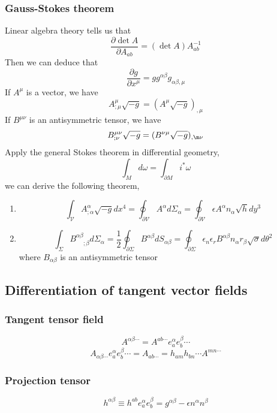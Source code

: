 \subsubsection{Gauss-Stokes theorem}
Linear algebra theory tells us that
\[\frac{\partial \det A}{\partial A_{ab}} = (\det A) A^{-1}_{ab}\]
Then we can deduce that
\[\frac{\partial g}{\partial x^{\mu}} = gg^{\alpha\beta} g_{\alpha\beta,\mu}\]
If $A^{\mu}$ is a vector, we have
\[A^{\mu}_{;\mu}\sqrt{-g} = (A^{\mu}\sqrt{-g})_{,\mu}\]
If $B^{\mu\nu}$ is an antisymmetric tensor, we have
\[B^{\mu\nu}_{;\nu}\sqrt{-g} = (B^{\nu\mu}\sqrt{-g})_{,\m\nu}\]
Apply the general Stokes theorem in differential geometry,
\[\int_{M} d\omega = \int_{\partial M} i^* \omega\]
we can derive the following theorem,\\

\begin{newthem}
\begin{enumerate} 
\item \[\int_{\mathcal{V}} A^{\alpha}_{;\alpha} \sqrt{-g} dx^4 = \oint_{\partial \mathcal{V}} A^{\alpha} d\Sigma_{\alpha} = \oint_{\partial \mathcal{V}} \epsilon A^{\alpha} n_{\alpha} \sqrt{h} dy^3\]
\item \[\int_{\Sigma} B^{\alpha \beta}_{\phantom{\alpha \beta};\beta} d\Sigma_{\alpha} = \frac{1}{2}\oint_{\partial \Sigma} B^{\alpha \beta} dS_{\alpha \beta} = \oint_{\partial \Sigma} \epsilon_n \epsilon_r B^{\alpha \beta} n_{\alpha} r_{\beta} \sqrt{\sigma} d\theta^2\]
where $B_{\alpha \beta}$ is an antisymmetric tensor
\end{enumerate}
\end{newthem}

\subsection{Differentiation of tangent vector fields}
\subsubsection{Tangent tensor field}
\[A^{\alpha \beta \cdots} = A^{ab\cdots} e_a^{\alpha} e_b^{\beta} \cdots\]
\[A_{\alpha \beta \cdots} e_a^{\alpha} e_b^{\beta} \cdots = A_{ab\cdots} = h_{am} h_{bn} \cdots A^{mn\cdots}\]
\subsubsection{Projection tensor}
\[h^{\alpha \beta} \equiv h^{ab}e_a^{\alpha} e_b^{\beta} = g^{\alpha \beta} - \epsilon n^{\alpha} n^{\beta}\]
